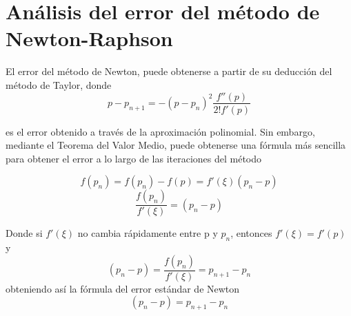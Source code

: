 \section{Análisis del error del método de Newton-Raphson}

El error del método de Newton, puede obtenerse a partir de su deducción del método de Taylor, donde 
\begin{displaymath}
p - p_{n+1} =  - (p-p_n)^2 \frac{f''(p)}{2!f'(p)}
\end{displaymath}

es el error obtenido a través de la aproximación polinomial. 
Sin embargo, mediante el Teorema del Valor Medio, puede obtenerse una fórmula más sencilla para obtener el error a lo largo de las iteraciones del método

\begin{displaymath}
f(p_n)= f(p_n) - f(p) = f'(\xi)(p_n-p)
\end{displaymath}
\begin{displaymath}
\frac{f(p_n)}{ f'(\xi)} =(p_n-p)
\end{displaymath}

Donde si $f'(\xi)$ no cambia rápidamente entre p y $p_n$, entonces $f'(\xi) = f'(p)$ y
\begin{displaymath}
(p_n-p)= \frac{f(p_n)}{ f'(\xi)} = p_{n+1} - p_n
\end{displaymath}
obteniendo así la fórmula del error estándar de Newton
\begin{equation}
(p_n-p)=  p_{n+1} - p_n
\end{equation}